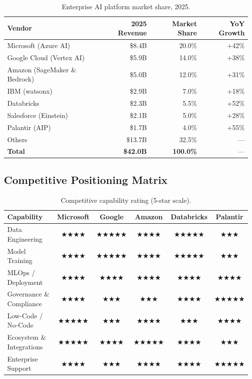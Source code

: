 \documentclass[
    language=english,
    doctype=market-analysis,
    institution=none,
]{../../omnilatex}
\begin{document}
\begin{table}[h]
    \centering
    \begin{tabular}{lrrr}
        \toprule
        \textbf{Vendor} & \textbf{2025 Revenue} & \textbf{Market Share} & \textbf{YoY Growth} \\
        \midrule
        Microsoft (Azure AI)        & \$8.4B  & 20.0\% & +42\% \\
        Google Cloud (Vertex AI)    & \$5.9B  & 14.0\% & +38\% \\
        Amazon (SageMaker \& Bedrock) & \$5.0B & 12.0\% & +31\% \\
        IBM (watsonx)              & \$2.9B  &  7.0\% & +18\% \\
        Databricks                 & \$2.3B  &  5.5\% & +52\% \\
        Salesforce (Einstein)      & \$2.1B  &  5.0\% & +28\% \\
        Palantir (AIP)             & \$1.7B  &  4.0\% & +55\% \\
        Others                     & \$13.7B & 32.5\% & --- \\
        \midrule
        \textbf{Total}             & \textbf{\$42.0B} & \textbf{100.0\%} & --- \\
        \bottomrule
    \end{tabular}
    \caption{Enterprise AI platform market share, 2025.}
\end{table}

\subsection{Competitive Positioning Matrix}

\begin{table}[h]
    \centering
    \begin{tabular}{lccccc}
        \toprule
        \textbf{Capability} & \textbf{Microsoft} & \textbf{Google} & \textbf{Amazon} & \textbf{Databricks} & \textbf{Palantir} \\
        \midrule
        Data Engineering       & ★★★★ & ★★★★★ & ★★★★ & ★★★★★ & ★★★ \\
        Model Training         & ★★★★ & ★★★★★ & ★★★★ & ★★★★★ & ★★★ \\
        MLOps / Deployment     & ★★★★ & ★★★★  & ★★★★ & ★★★★  & ★★★★ \\
        Governance \& Compliance & ★★★★ & ★★★   & ★★★  & ★★★★  & ★★★★★ \\
        Low-Code / No-Code     & ★★★★★ & ★★★  & ★★★★ & ★★★   & ★★★★ \\
        Ecosystem \& Integrations & ★★★★★ & ★★★★ & ★★★★★ & ★★★★ & ★★★ \\
        Enterprise Support     & ★★★★ & ★★★   & ★★★★ & ★★★★  & ★★★★★ \\
        \bottomrule
    \end{tabular}
    \caption{Competitive capability rating (5-star scale).}
\end{table}
\end{document}
